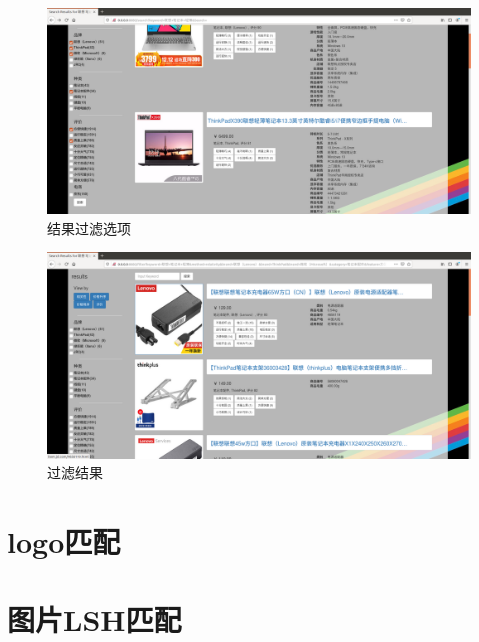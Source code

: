 \begin{figure}[htbp]
\centering
\includegraphics[width=13.5cm]{img/zlt/filter1.png}
\caption{结果过滤选项}
\label{fig:zlt_filter1}
\end{figure}

\begin{figure}[htbp]
\centering
\includegraphics[width=13.5cm]{img/zlt/filter1_result.png}
\caption{过滤结果}
\label{fig:zlt_filter1_result}
\end{figure}

\section{logo匹配}

\section{图片LSH匹配}
